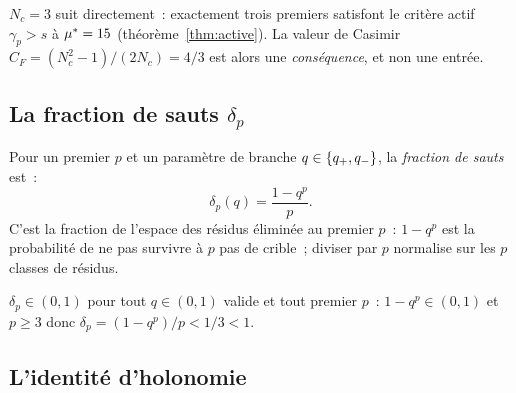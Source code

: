 \documentclass[12pt,a4paper]{article}
\begin{document}
$N_c = 3$ suit directement~: exactement trois premiers satisfont le
critère actif $\gamma_p > s$ à ${\mu^{*}} = 15$
(théorème~\ref{thm:active}). La valeur de Casimir
$C_F = (N_c^2 - 1)/(2N_c) = 4/3$ est alors une \emph{conséquence}, et
non une entrée.

\subsection{La fraction de sauts $\delta_p$}
\label{sec:delta_p}

\begin{definition}
\label{def:delta}
Pour un premier $p$ et un paramètre de branche
$q \in \{q_{+}, q_{-}\}$, la \emph{fraction de sauts} est~:
\begin{equation}
  \delta_p(q) = \frac{1 - q^p}{p}.
  \label{eq:delta_def}
\end{equation}
C'est la fraction de l'espace des résidus éliminée au premier $p$~:
$1 - q^p$ est la probabilité de ne pas survivre à $p$ pas de crible~;
diviser par $p$ normalise sur les $p$ classes de résidus.
\end{definition}

\begin{remarque}
$\delta_p \in (0, 1)$ pour tout $q \in (0,1)$ valide et tout premier
$p$~: $1 - q^p \in (0,1)$ et $p \geq 3$ donc
$\delta_p = (1-q^p)/p < 1/3 < 1$.
\end{remarque}

\subsection{L'identité d'holonomie}
\label{sec:holonomy_id}
\end{document}
